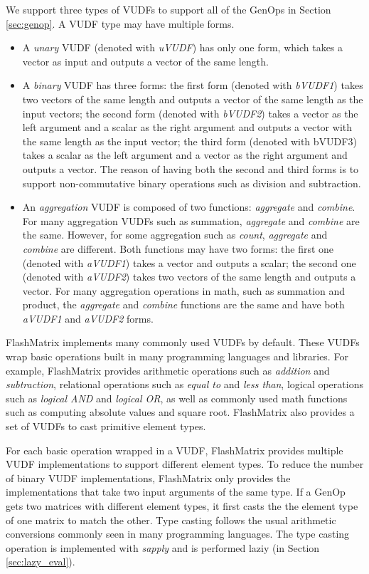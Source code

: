 We support three types of VUDFs to support all of the GenOps in Section
\ref{sec:genop}. A VUDF type may have multiple forms.
\begin{itemize}
	\item A \textit{unary} VUDF (denoted with \textit{uVUDF}) has only one form,
		which takes a vector as input and outputs a vector of the same length.
	\item A \textit{binary} VUDF has three forms: the first form (denoted with
		\textit{bVUDF1}) takes two vectors of the same length and outputs
		a vector of the same length as the input vectors; the second form (denoted
		with \textit{bVUDF2}) takes a vector as the left argument and a scalar
		as the right argument and outputs a vector with the same length as
		the input vector; the third form (denoted with bVUDF3) takes a scalar
		as the left argument and a vector as the right
		argument and outputs a vector. The reason of having both the second and third
		forms is to support non-commutative binary operations such as division and
		subtraction.
	\item An \textit{aggregation} VUDF is composed of two functions:
		\textit{aggregate} and \textit{combine}. For many aggregation VUDFs
		such as summation, \textit{aggregate} and \textit{combine} are the same.
		However, for some aggregation such as \textit{count}, \textit{aggregate}
		and \textit{combine} are different. Both functions may have two forms:
		the first one (denoted with \textit{aVUDF1}) takes a vector and outputs
		a scalar; the second one (denoted with \textit{aVUDF2}) takes two
		vectors of the same length and outputs a vector. For many aggregation
		operations in math, such as summation and product, the \textit{aggregate}
		and \textit{combine} functions are the same and have both \textit{aVUDF1}
		and \textit{aVUDF2} forms.
\end{itemize}

FlashMatrix implements many commonly used VUDFs by default. These VUDFs wrap
basic operations built in many programming languages and libraries. For example,
FlashMatrix provides arithmetic operations such as \textit{addition} and
\textit{subtraction}, relational operations such as \textit{equal to} and
\textit{less than}, logical operations such as \textit{logical AND} and
\textit{logical OR}, as well as commonly used math functions such as computing
absolute values and square root. FlashMatrix also provides a set of VUDFs to
cast primitive element types.

For each basic operation wrapped in a VUDF, FlashMatrix provides multiple
VUDF implementations to support different element types. To reduce the number
of binary VUDF implementations,
FlashMatrix only provides the implementations that take two input arguments of
the same type. If a GenOp gets two matrices with different
element types, it first casts the the element type of one matrix to match
the other. Type casting follows the usual arithmetic conversions \cite{}
commonly seen in many programming languages. The type casting operation is
implemented with \textit{sapply} and is performed laziy (in Section
\ref{sec:lazy_eval}).

